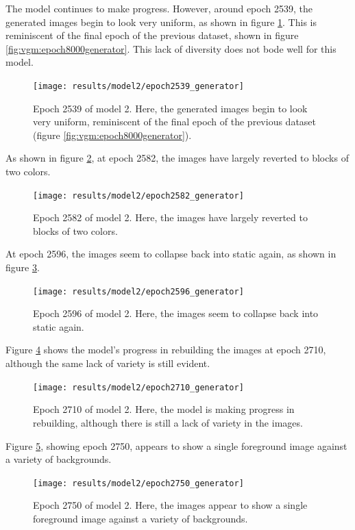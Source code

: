 \documentclass[11pt,letterpaper]{article}
\begin{document}
				The model continues to make progress.
				However, around epoch 2539, the generated images begin to look very uniform, as shown in figure \ref{fig:cgvg:epoch2539generator}.
				This is reminiscent of the final epoch of the previous dataset, shown in figure \ref{fig:vgm:epoch8000generator}.
				This lack of diversity does not bode well for this model.
				\begin{figure}
					\centering
					\texttt{[image: results/model2/epoch2539\_generator]}
					\caption{Epoch 2539 of model 2. Here, the generated images begin to look very uniform, reminiscent of the final epoch of the previous dataset (figure \ref{fig:vgm:epoch8000generator}).}
					\label{fig:cgvg:epoch2539generator}
				\end{figure}

				As shown in figure \ref{fig:cgvg:epoch2582generator}, at epoch 2582, the images have largely reverted to blocks of two colors.
				\begin{figure}
					\centering
					\texttt{[image: results/model2/epoch2582\_generator]}
					\caption{Epoch 2582 of model 2. Here, the images have largely reverted to blocks of two colors.}
					\label{fig:cgvg:epoch2582generator}
				\end{figure}

				At epoch 2596, the images seem to collapse back into static again, as shown in figure \ref{fig:cgvg:epoch2596generator}.
				\begin{figure}
					\centering
					\texttt{[image: results/model2/epoch2596\_generator]}
					\caption{Epoch 2596 of model 2. Here, the images seem to collapse back into static again.}
					\label{fig:cgvg:epoch2596generator}
				\end{figure}

				Figure \ref{fig:cgvg:epoch2710generator} shows the model's progress in rebuilding the images at epoch 2710, although the same lack of variety is still evident.
				\begin{figure}
					\centering
					\texttt{[image: results/model2/epoch2710\_generator]}
					\caption{Epoch 2710 of model 2. Here, the model is making progress in rebuilding, although there is still a lack of variety in the images.}
					\label{fig:cgvg:epoch2710generator}
				\end{figure}

				Figure \ref{fig:cgvg:epoch2750generator}, showing epoch 2750, appears to show a single foreground image against a variety of backgrounds.
				\begin{figure}
					\centering
					\texttt{[image: results/model2/epoch2750\_generator]}
					\caption{Epoch 2750 of model 2. Here, the images appear to show a single foreground image against a variety of backgrounds.}
					\label{fig:cgvg:epoch2750generator}
				\end{figure}
\end{document}
